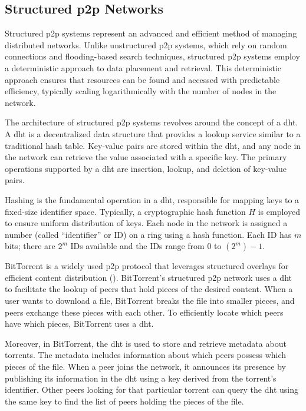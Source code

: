 \subsection*{Structured \gls{p2p} Networks}
Structured \gls{p2p} systems represent an advanced and efficient method of managing distributed networks.
Unlike unstructured \gls{p2p} systems, which rely on random connections and flooding-based search techniques, structured \gls{p2p} systems employ a deterministic approach to data placement and retrieval.
This deterministic approach ensures that resources can be found and accessed with predictable efficiency, typically scaling logarithmically with the number of nodes in the network.

The architecture of structured \gls{p2p} systems revolves around the concept of a \gls{dht}.
A \gls{dht} is a decentralized data structure that provides a lookup service similar to a traditional hash table.
Key-value pairs are stored within the \gls{dht}, and any node in the network can retrieve the value associated with a specific key.
The primary operations supported by a \gls{dht} are insertion, lookup, and deletion of key-value pairs.

Hashing is the fundamental operation in a \gls{dht}, responsible for mapping keys to a fixed-size identifier space.
Typically, a cryptographic hash function $H$ is employed to ensure uniform distribution of keys.
Each node in the network is assigned a number (called ``identifier'' or ID) on a ring using a hash function.
Each ID has $m$ bits; there are $2^m$ IDs available and the IDs range from 0 to $(2^m) -1$.

BitTorrent is a widely used \gls{p2p} protocol that leverages structured overlays for efficient content distribution (\cite{BitTorrent2005}).
BitTorrent's structured \gls{p2p} network uses a \gls{dht} to facilitate the lookup of peers that hold pieces of the desired content.
When a user wants to download a file, BitTorrent breaks the file into smaller pieces, and peers exchange these pieces with each other.
To efficiently locate which peers have which pieces, BitTorrent uses a \gls{dht}.

Moreover, in BitTorrent, the \gls{dht} is used to store and retrieve metadata about torrents.
The metadata includes information about which peers possess which pieces of the file.
When a peer joins the network, it announces its presence by publishing its information in the \gls{dht} using a key derived from the torrent's identifier.
Other peers looking for that particular torrent can query the \gls{dht} using the same key to find the list of peers holding the pieces of the file.

